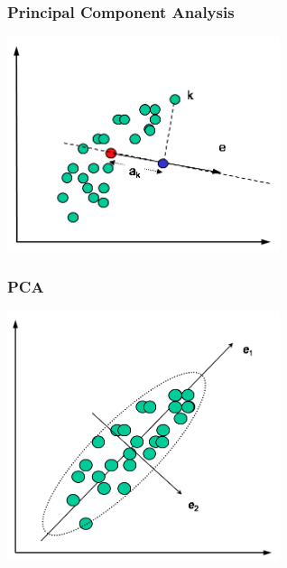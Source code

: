 \documentclass[10pt, colorlinks]{beamer}
\begin{document}
\begin{frame}
    \frametitle{Principal Component Analysis }
    
    \begin{center}
        \centering \includegraphics[width=0.6\textwidth]{figs/pca1}
    \end{center}        
    
\end{frame}


\begin{frame}
    \frametitle{PCA }
    \begin{center}
        \centering \includegraphics[width=0.6\textwidth]{figs/pca2}
    \end{center}
\end{frame}

 
\end{document}
